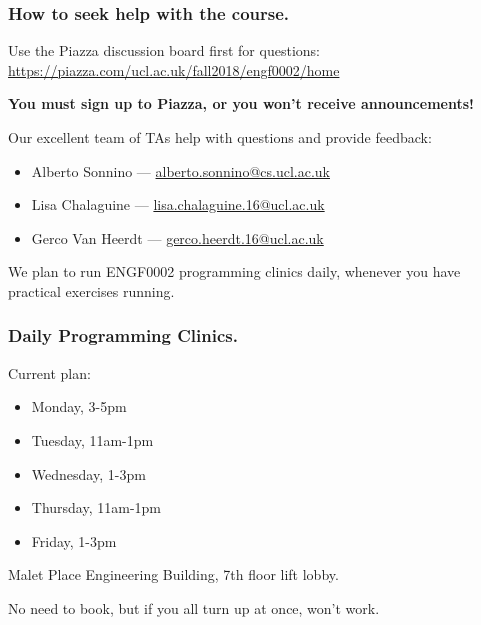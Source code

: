 \documentclass{beamer} %
\newcommand\emc[1]{\textcolor{midred}{\textbf{#1}}}
\begin{document}
\begin{frame}
\frametitle{How to seek help with the course.} 

Use the Piazza discussion board first for questions:\\
\url{https://piazza.com/ucl.ac.uk/fall2018/engf0002/home}

\vspace{1mm}
\emc{You must sign up to Piazza, or you won't receive announcements!}


\vspace{3mm}
Our excellent team of TAs help with questions and provide feedback:
\begin{itemize}
\item Alberto Sonnino --- \url{alberto.sonnino@cs.ucl.ac.uk}
\item Lisa Chalaguine --- \url{lisa.chalaguine.16@ucl.ac.uk}
\item Gerco Van Heerdt --- \url{gerco.heerdt.16@ucl.ac.uk}
\end{itemize}

We plan to run ENGF0002 programming clinics daily, whenever you have practical
exercises running.
\end{frame}

\begin{frame}
  \frametitle{Daily Programming Clinics.}

  Current plan:
  \begin{itemize}
  \item Monday, 3-5pm
  \item Tuesday, 11am-1pm
  \item Wednesday, 1-3pm
  \item Thursday, 11am-1pm
  \item Friday, 1-3pm
  \end{itemize}

  Malet Place Engineering Building, 7th floor lift lobby.

  No need to book, but if you all turn up at once, won't work.
\end{frame}
\end{document}
